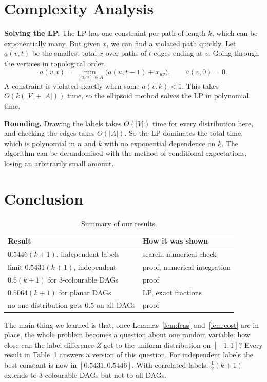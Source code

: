\documentclass[sigconf,nonacm]{acmart}
\begin{document}
\section{Complexity Analysis}
\textbf{Solving the LP.} The LP has one constraint per path of length $k$, which can be exponentially many. But given $x$, we can find a violated path quickly. Let $a(v,t)$ be the smallest total $x$ over paths of $t$ edges ending at $v$. Going through the vertices in topological order,
\[a(v,t)=\min_{(u,v)\in A}\big(a(u,t-1)+x_{uv}\big),\qquad a(v,0)=0.\]
A constraint is violated exactly when some $a(v,k)<1$. This takes $O(k(|V|+|A|))$ time, so the ellipsoid method solves the LP in polynomial time.

\textbf{Rounding.} Drawing the labels takes $O(|V|)$ time for every distribution here, and checking the edges takes $O(|A|)$. So the LP dominates the total time, which is polynomial in $n$ and $k$ with no exponential dependence on $k$. The algorithm can be derandomised with the method of conditional expectations, losing an arbitrarily small amount.

\section{Conclusion}
\begin{table}[h]
\caption{Summary of our results.}\label{tab:ours}
\small
\begin{tabular}{@{}>{\raggedright\arraybackslash}p{}>{\raggedright\arraybackslash}p{}@{}}
\toprule
Result & How it was shown\\
\midrule
$0.5446(k+1)$, independent labels & search, numerical check\\
limit $0.5431(k+1)$, independent & proof, numerical integration\\
$0.5(k+1)$ for 3-colourable DAGs & proof\\
$0.5064(k+1)$ for planar DAGs & LP, exact fractions\\
no one distribution gets $0.5$ on all DAGs & proof\\
\bottomrule
\end{tabular}
\end{table}

 The main thing we learned is that, once Lemmas~\ref{lem:feas} and~\ref{lem:cost} are in place, the whole problem becomes a question about one random variable: how close can the label difference $Z$ get to the uniform distribution on $[-1,1]$? Every result in Table~\ref{tab:ours} answers a version of this question. For independent labels the best constant is now in $[0.5431,0.5446]$. With correlated labels, $\frac12(k+1)$ extends to 3-colourable DAGs but not to all DAGs.
\end{document}
